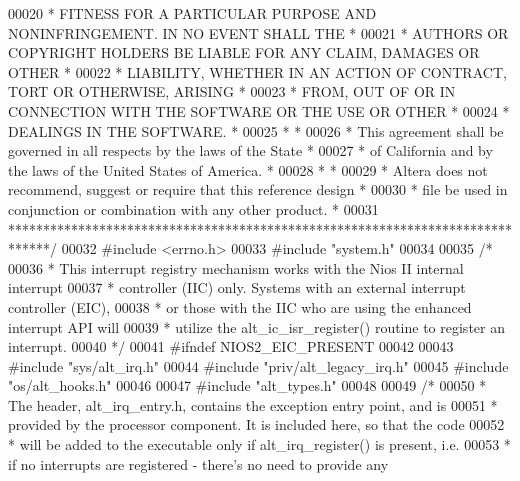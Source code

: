 \begin{DoxyCode}
00020 \textcolor{comment}{* FITNESS FOR A PARTICULAR PURPOSE AND NONINFRINGEMENT. IN NO EVENT SHALL THE *}
00021 \textcolor{comment}{* AUTHORS OR COPYRIGHT HOLDERS BE LIABLE FOR ANY CLAIM, DAMAGES OR OTHER      *}
00022 \textcolor{comment}{* LIABILITY, WHETHER IN AN ACTION OF CONTRACT, TORT OR OTHERWISE, ARISING     *}
00023 \textcolor{comment}{* FROM, OUT OF OR IN CONNECTION WITH THE SOFTWARE OR THE USE OR OTHER         *}
00024 \textcolor{comment}{* DEALINGS IN THE SOFTWARE.                                                   *}
00025 \textcolor{comment}{*                                                                             *}
00026 \textcolor{comment}{* This agreement shall be governed in all respects by the laws of the State   *}
00027 \textcolor{comment}{* of California and by the laws of the United States of America.              *}
00028 \textcolor{comment}{*                                                                             *}
00029 \textcolor{comment}{* Altera does not recommend, suggest or require that this reference design    *}
00030 \textcolor{comment}{* file be used in conjunction or combination with any other product.          *}
00031 \textcolor{comment}{******************************************************************************/}
00032 \textcolor{preprocessor}{#include <errno.h>}
00033 \textcolor{preprocessor}{#include "system.h"}
00034 
00035 \textcolor{comment}{/*}
00036 \textcolor{comment}{ * This interrupt registry mechanism works with the Nios II internal interrupt }
00037 \textcolor{comment}{ * controller (IIC) only. Systems with an external interrupt controller (EIC),}
00038 \textcolor{comment}{ * or those with the IIC who are using the enhanced interrupt API will}
00039 \textcolor{comment}{ * utilize the alt\_ic\_isr\_register() routine to register an interrupt. }
00040 \textcolor{comment}{ */}
00041 \textcolor{preprocessor}{#ifndef NIOS2\_EIC\_PRESENT}
00042 
00043 \textcolor{preprocessor}{#include "sys/alt_irq.h"}
00044 \textcolor{preprocessor}{#include "priv/alt_legacy_irq.h"}
00045 \textcolor{preprocessor}{#include "os/alt_hooks.h"}
00046 
00047 \textcolor{preprocessor}{#include "alt_types.h"}
00048 
00049 \textcolor{comment}{/*}
00050 \textcolor{comment}{ * The header, alt\_irq\_entry.h, contains the exception entry point, and is}
00051 \textcolor{comment}{ * provided by the processor component. It is included here, so that the code}
00052 \textcolor{comment}{ * will be added to the executable only if alt\_irq\_register() is present, i.e.}
00053 \textcolor{comment}{ * if no interrupts are registered - there's no need to provide any }

\end{DoxyCode}
